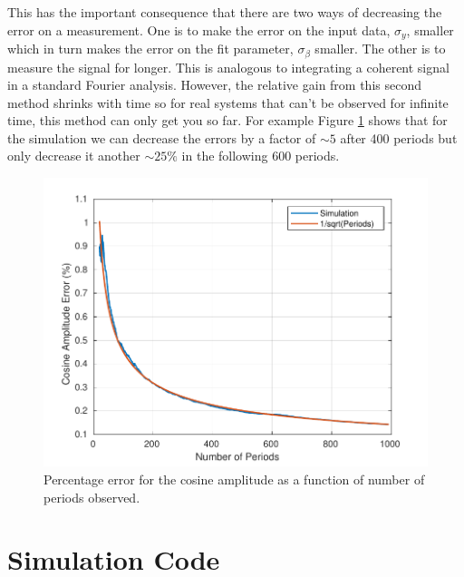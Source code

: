 \documentclass{article}
\begin{document}
This has the important consequence that there are two ways of decreasing the error on a measurement. One is to make the error on the input data, $\sigma_y$, smaller which in turn makes the error on the fit parameter, $\sigma_\beta$ smaller. The other is to measure the signal for longer. This is analogous to integrating a coherent signal in a standard Fourier analysis. However, the relative gain from this second method shrinks with time so for real systems that can't be observed for infinite time, this method can only get you so far. For example Figure \ref{err} shows that for the simulation we can decrease the errors by a factor of $\sim5$ after 400 periods but only decrease it another $\sim25\%$ in the following 600 periods.

\begin{figure}[!h]
\begin{centering}
\includegraphics[width=\textwidth]{ErrorVsPeriods.pdf}
\caption{Percentage error for the cosine amplitude as a function of number of periods observed.}\label{err}
\end{centering}
\end{figure}
\pagebreak
\section{Simulation Code}
\end{document}
